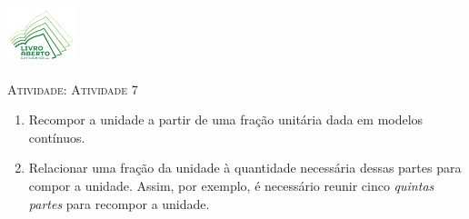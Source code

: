 \documentclass[10 pt,usenames,dvipsnames, oneside]{article}
\begin{document}
\begin{center}
  \begin{minipage}[l]{3cm}
\includegraphics[width=2cm]{../../../Figuras/logo}       
\end{minipage}\hfill
\begin{minipage}[r]{.8\textwidth}
 {\Large \scshape Atividade: Atividade 7}  
\end{minipage}
\end{center}
\vspace{.2cm}

\ifdefined\prof
\begin{goals}
\begin{enumerate}

\item       Recompor a unidade a partir de uma fração unitária dada em modelos contínuos.
\item       Relacionar uma fração da unidade à quantidade necessária dessas partes para compor a unidade. Assim, por exemplo, é necessário reunir cinco       {\it quintas partes}       para recompor a unidade.


\end{enumerate}
\end{goals}
\end{document}
